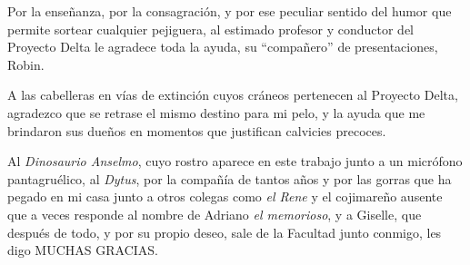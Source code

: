 \begin{acknowledgements}

\begin{flushright}


\end{flushright}

\bigskip

Por la enseñanza, por la consagración, y por ese peculiar sentido del humor que permite sortear cualquier pejiguera, al estimado profesor y conductor del Proyecto Delta le agradece toda la ayuda, su ``compañero'' de presentaciones, Robin.

A las cabelleras en vías de extinción cuyos cráneos pertenecen al Proyecto Delta, agradezco que se retrase el mismo destino para mi pelo, y la ayuda que me brindaron sus dueños en momentos que justifican calvicies precoces.

Al \textit{Dinosaurio Anselmo}, cuyo rostro aparece en este trabajo junto a un micrófono pantagruélico, al \textit{Dytus}, por la compañía de tantos años y por las gorras que ha pegado en mi casa junto a otros colegas como \textit{el Rene} y el cojimareño ausente que a veces responde al nombre de Adriano \textit{el memorioso}, y a Giselle, que después de todo, y por su propio deseo, sale de la Facultad junto conmigo, les digo MUCHAS GRACIAS.


\end{acknowledgements}
